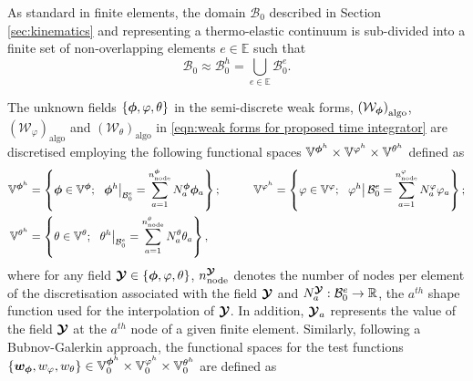 
As standard in finite elements, the domain $\mathcal{B}_0$ described in Section \ref{sec:kinematics} and representing a thermo-elastic continuum is sub-divided into a finite set of non-overlapping elements $e \in \mathbb{E}$ such that 
%
\begin{equation}
\mathcal{B}_0\approx \mathcal{B}_0^h = \bigcup_{e\in\mathbb{E}}   \mathcal{B}^e_{0}.
\end{equation}

The unknown fields $\{\boldsymbol{\phi},\varphi,\theta\}$ in the semi-discrete weak forms, $\left(\mathcal{W}_{\boldsymbol{\phi}}\right)_{\text{algo}}$, $\left(\mathcal{W}_{\varphi}\right)_{\text{algo}}$ and $\left(\mathcal{W}_{{\theta}}\right)_{\text{algo}}$ in \eqref{eqn:weak forms for proposed time integrator} are discretised employing the following functional spaces $\mathbb{V}^{\boldsymbol{\phi}^h}\times\mathbb{V}^{{\varphi}^h}\times\mathbb{V}^{{\theta}^h}$ defined as
%
\begin{equation}
  \label{eqn:functional spaces for discretisation}
  \begin{aligned}
    \mathbb{V}^{\boldsymbol{\phi}^h}& = \left\{
      \boldsymbol{\phi}\in \mathbb{V}^{\boldsymbol{\phi}}; \;\;
      \left.\boldsymbol{\phi}^h\right|_{\mathcal{B}_0^e} = \sum_{a=1}^{n_{\text{node}}^{\boldsymbol{\phi}}}N^{\boldsymbol{\phi}}_a\boldsymbol{\phi}_a
    \right\} ; &\qquad
    \mathbb{V}^{\varphi^h}& = \left\{
      \varphi\in \mathbb{V}^{\varphi}; \;\;
      \left.\varphi^h\right|{\mathcal{B}_0^e} = \sum_{a=1}^{n_{\text{node}}^{\varphi}}N^{\varphi}_a\varphi_{a}
    \right\} ; \\
    \mathbb{V}^{\theta^h}& = \left\{
      \theta\in \mathbb{V}^{\theta}; \;\;
      \left.\theta^h\right|_{\mathcal{B}_0^e} = \sum_{a=1}^{n_{\text{node}}^{\theta}}N^{\theta}_a\theta_{a}
    \right\} ,
  \end{aligned}
\end{equation}
%
where for any field $\boldsymbol{\mathcal{Y}}\in\{\boldsymbol{\phi},\varphi,\theta\}$, $n_{\text{node}}^{\boldsymbol{\mathcal{Y}}}$ denotes the number of nodes per element of the discretisation associated with the field $\boldsymbol{\mathcal{Y}}$ and $N^{\boldsymbol{\mathcal{Y}}}_{a}:\mathcal{B}_0^e\rightarrow \mathbb{R}$,  the $a^{th}$ shape function used for the interpolation of  $\boldsymbol{\mathcal{Y}}$. 
In addition, $\boldsymbol{\mathcal{Y}}_a$ represents the value of the field $\boldsymbol{\mathcal{Y}}$ at the $a^{th}$ node of a given finite element. 
Similarly, following a Bubnov-Galerkin approach, the functional spaces for the test functions $\{\boldsymbol{w}_{\boldsymbol{\phi}},w_{\varphi},w_{\theta}\}\in \mathbb{V}^{\boldsymbol{\phi}^h}_0 \times \mathbb{V}^{{\varphi}^h}_0 \times \mathbb{V}_0^{\theta^h}$ are defined as
